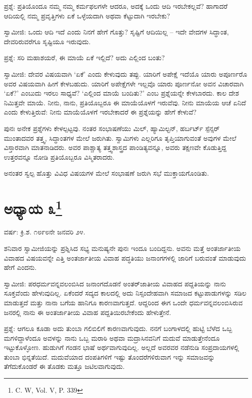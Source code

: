 ಪ್ರಶ್ನೆ: ಪ್ರತಿಯೊಂದೂ ನಮ್ಮ ನಮ್ಮ ಕರ್ಮಫಲಗಳೇ ಆದರೂ, ಅದಕ್ಕೆ ಒಂದು ಆದಿ ಇರಬೇಕಲ್ಲವೆ? ಹಾಗಾದರೆ ಆದಿಯಲ್ಲಿ ನಮ್ಮ ಪ್ರವೃತ್ತಿಗಳು ಏಕೆ ಒಳ್ಳೆಯದಾಗಿ ಅಥವಾ ಕೆಟ್ಟುದಾಗಿ ಇರಬೇಕು?

ಸ್ವಾಮೀಜಿ: ಒಂದು ಆದಿ ಇದೆ ಎಂದು ನಿನಗೆ ಹೇಗೆ ಗೊತ್ತು? ಸೃಷ್ಟಿಗೆ ಆದಿಯಿಲ್ಲ – ಇದೇ ವೇದಗಳ ಸಿದ್ಧಾಂತ, ದೇವರಿರುವರೆಗೂ ಸೃಷ್ಟಿಯೂ ಇರುವುದು.

ಪ್ರಶ್ನೆ: ಸರಿ ಮಹಾಶಯರೆ, ಈ ಮಾಯೆ ಏಕೆ ಇಲ್ಲಿದೆ? ಅದು ಎಲ್ಲಿಂದ ಬಂತು?

ಸ್ವಾಮೀಜಿ: ದೇವರ ವಿಷಯವಾಗಿ ‘ಏಕೆ’ ಎಂದು ಕೇಳುವುದು ತಪ್ಪು. ಯಾರಿಗೆ ಅಪೇಕ್ಷೆ ಇದೆಯೊ ಯಾರು ಅಪೂರ್ಣರೊ ಅವರ ವಿಷಯವಾಗಿ ಹೀಗೆ ಕೇಳಬಹುದು. ಯಾರಿಗೆ ಅಪೇಕ್ಷೆಗಳೇ ಇಲ್ಲವೊ ಯಾರು ಪೂರ್ಣನೋ ಅವನ ವಿಚಾರವಾಗಿ ‘ಏಕೆ?’ ಎಂಬುದು ಇರಲು ಸಾಧ್ಯವೆ? ‘ಎಲ್ಲಿಂದ ಮಾಯೆ ಬಂದಿತು?’ ಎಂಬ ಪ್ರಶ್ನೆಯನ್ನೇ ಕೇಳಬಾರದು. ಕಾಲ ದೇಶ ನಿಮಿತ್ತವೇ ಮಾಯೆ. ನೀನು, ನಾನು, ಪ್ರತಿಯೊಬ್ಬರೂ ಈ ಮಾಯೆಯೊಳಗೆ ಇರುವೆವು. ನೀನು ಮಾಯೆಯ ಆಚೆ ಏನಿದೆ ಎಂದು ಕೇಳುತ್ತಿರುವೆ: ನೀನು ಮಾಯೆಯೊಳಗೆ ಇರಬೇಕಾದರೆ ಈ ಪ್ರಶ್ನೆಯನ್ನು ಹೇಗೆ ಕೇಳುವೆ?

ಪುನಃ ಅನೇಕ ಪ್ರಶ್ನೆಗಳು ಕೇಳಲ್ಪಟ್ಟವು. ನಂತರ ಸಂಭಾಷಣೆಯು ಮಿಲ್, ಹ್ಯಾಮಿಲ್ಟನ್, ಹರ್ಬರ್ಟ್ ಸ್ಪೆನ್ಸರ್ ಮುಂತಾದವರ ತತ್ತ್ವ, ಸಿದ್ಧಾಂತಗಳ ಮೇಲೆ ಜರುಗಿತು. ಸ್ವಾಮಿಗಳು ಎಲ್ಲರಿಗೂ ತೃಪ್ತಿಯಾಗುವಂತೆ ಅವುಗಳ ಮೇಲೆ ವಿಸ್ತಾರವಾಗಿ ಮಾತನಾಡಿದರು. ಅವರ ಪಾಶ್ಚಾತ್ಯ ತತ್ತ್ವಶಾಸ್ತ್ರದ ಪಾಂಡಿತ್ಯವನ್ನೂ, ಅವರು ತಕ್ಷಣವೇ ಕೊಡುತ್ತಿದ್ದ ಉತ್ತರವನ್ನೂ ನೋಡಿ ಪ್ರತಿಯೊಬ್ಬರೂ ವಿಸ್ಮಿತರಾದರು.

ಅನಂತರ ಸ್ವಲ್ಪ ಹೊತ್ತು ವಿವಿಧ ವಿಷಯಗಳ ಮೇಲೆ ಸಂಭಾಷಣೆ ಜರುಗಿ ಸಭೆ ಮುಕ್ತಾಯಗೊಂಡಿತು.

\newpage

\chapter[ಅಧ್ಯಾಯ ೩]{ಅಧ್ಯಾಯ ೩\protect\footnote{\engfoot{} C. W, Vol. V, P. 339}}

\begin{center}
ವರ್ಷ: ಕ್ರಿ.ಶ. ೧೮೯೮ನೇ ಜನವರಿ ೨೪.
\end{center}

ಶನಿವಾರ ಸ್ವಾಮೀಜಿಯನ್ನು ಪ್ರಶ್ನಿಸಿದ ಸಭ್ಯ ಮನುಷ್ಯನೇ ಪುನಃ ಇಂದೂ ಬಂದಿದ್ದನು. ಅವನು ಮತ್ತೆ ಅಂತರ್ಜಾತೀಯ ವಿವಾಹದ ವಿಷಯವನ್ನೇ ಎತ್ತಿ ಅಂತರ್ಜಾತೀಯ ವಿವಾಹ ಪದ್ಧತಿಯು ಜನಾಂಗಗಳಲ್ಲಿ ಜಾರಿಗೆ ಬರುವಂತೆ ಮಾಡುವುದು ಹೇಗೆ ಎಂದನು.

ಸ್ವಾಮೀಜಿ: ಪರಧರ್ಮವನ್ನವಲಂಬಿಸಿದ ಜನಾಂಗದೊಡನೆ ಅಂತರ್‌ಜಾತೀಯ ವಿವಾಹದ ಪದ್ದತಿಯನ್ನು ನಾನು ಸೂಕ್ತವೆಂದು ಹೇಳುವುದಿಲ್ಲ. ಏಕೆಂದರೆ ಸದ್ಯದ ಕಾಲದಲ್ಲಿ ಅದು ನಿಸ್ಸಂದೇಹವಾಗಿ ಸಮಾಜದ ಕಟ್ಟುಪಾಡುಗಳನ್ನು ಸಡಿಲ ಮಾಡುತ್ತದೆ ಮತ್ತು ನಾನಾ ಬಗೆಯ ಹಾನಿಗೂ ಕಾರಣವಾಗುತ್ತದೆ. ಆದ್ದರಿಂದ ಈಗ ಒಂದೇ ಧರ್ಮವನ್ನವಲಂಬಿಸಿರುವ ಜನರಲ್ಲಿ ನಾನು ಈ ಅಂತರ್ಜಾತೀಯ ವಿವಾಹ ಪದ್ದತಿಯಿರಬೇಕೆಂದು ಹೇಳುತ್ತೇನೆ.

ಪ್ರಶ್ನೆ: ಆಗಲೂ ಕೂಡಾ ಅದು ತುಂಬಾ ಗಲಿಬಿಲಿಗೆ ಕಾರಣವಾಗುವುದು. ನನಗೆ ಬಂಗಾಳದಲ್ಲಿ ಹುಟ್ಟಿ ಬೆಳೆದ ಒಬ್ಬ ಮಗಳಿದ್ದಾಳೆಂದೂ ಅವಳನ್ನು ನಾನು ಒಬ್ಬ ಮರಾಠಿ ಅಥವಾ ಮದ್ರಾಸಿನವನಿಗೆ ಮದುವೆ ಮಾಡುತ್ತೇನೆಂದೂ ಇಟ್ಟುಕೊಳ್ಳೋಣ. ಹುಡುಗಿಗೆ ಗಂಡನ ಭಾಷೆ ಅರ್ಥವಾಗುವುದಿಲ್ಲ. ಅಲ್ಲದೆ ಅವರವರ ನಡೆನುಡಿ ಸಂಪ್ರದಾಯಗಳಲ್ಲಿ ತುಂಬಾ ಭಿನ್ನತೆಯಿದೆ. ಮದುವೆಯಾದ ದಂಪತಿಗಳಿಗೆ ಇಷ್ಟು ತೊಂದರೆಗಳಿರುವಾಗ ಇನ್ನು ಸಮಾಜವನ್ನು ತೆಗೆದುಕೊಂಡರೆ ಈ ತೊಡಕು ಮತ್ತೂ ಜಟಿಲವಾಗುವುದು.

